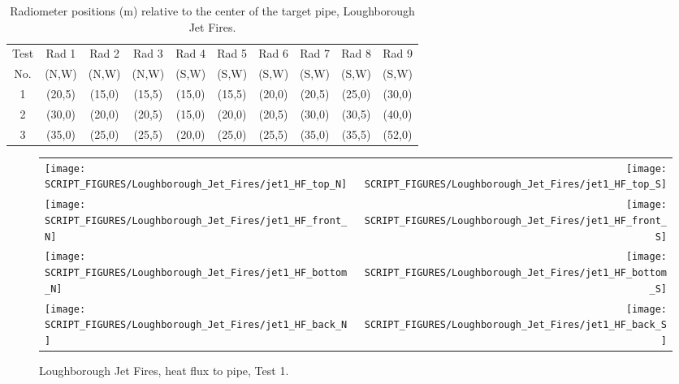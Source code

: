 \begin{table}[!ht]
\caption[Radiometer positions, Loughborough Jet Fires]{Radiometer positions (m) relative to the center of the target pipe, Loughborough Jet Fires.}
\centering
\begin{tabular}{|c|ccccccccc|}
\hline
Test     & Rad 1  & Rad 2   & Rad 3   & Rad 4   & Rad 5   & Rad 6   & Rad 7   & Rad 8   & Rad 9    \\
No.      & (N,W)  & (N,W)   & (N,W)   & (S,W)   & (S,W)   & (S,W)   & (S,W)   & (S,W)   & (S,W)    \\ \hline
1        & (20,5) & (15,0)  & (15,5)  & (15,0)  & (15,5)  & (20,0)  & (20,5)  & (25,0)  & (30,0)   \\
2        & (30,0) & (20,0)  & (20,5)  & (15,0)  & (20,0)  & (20,5)  & (30,0)  & (30,5)  & (40,0)   \\
3        & (35,0) & (25,0)  & (25,5)  & (20,0)  & (25,0)  & (25,5)  & (35,0)  & (35,5)  & (52,0)   \\ \hline
\end{tabular}
\label{Loughborough_rads}
\end{table}


\newpage

\begin{figure}[p]
\begin{tabular*}{\textwidth}{l@{\extracolsep{\fill}}r}
\texttt{[image: SCRIPT\_FIGURES/Loughborough\_Jet\_Fires/jet1\_HF\_top\_N]} &
\texttt{[image: SCRIPT\_FIGURES/Loughborough\_Jet\_Fires/jet1\_HF\_top\_S]} \\
\texttt{[image: SCRIPT\_FIGURES/Loughborough\_Jet\_Fires/jet1\_HF\_front\_N]} &
\texttt{[image: SCRIPT\_FIGURES/Loughborough\_Jet\_Fires/jet1\_HF\_front\_S]} \\
\texttt{[image: SCRIPT\_FIGURES/Loughborough\_Jet\_Fires/jet1\_HF\_bottom\_N]} &
\texttt{[image: SCRIPT\_FIGURES/Loughborough\_Jet\_Fires/jet1\_HF\_bottom\_S]} \\
\texttt{[image: SCRIPT\_FIGURES/Loughborough\_Jet\_Fires/jet1\_HF\_back\_N]} &
\texttt{[image: SCRIPT\_FIGURES/Loughborough\_Jet\_Fires/jet1\_HF\_back\_S]}
\end{tabular*}
\caption[Loughborough Jet Fires, heat flux to pipe, Test 1]{Loughborough Jet Fires, heat flux to pipe, Test 1.}
\label{Loughborough_1}
\end{figure}

